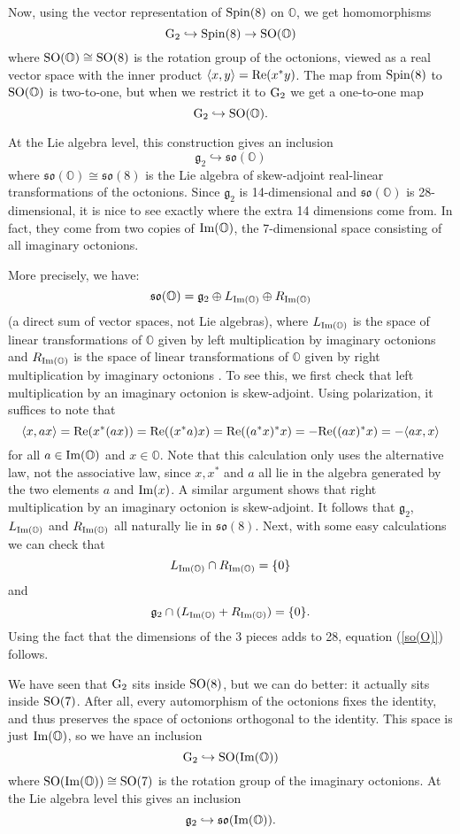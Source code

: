 \documentclass[12pt]{article}
\renewcommand\O{{\mathbb O}}
\newcommand{\SO}{{\rm SO}}
\newcommand{\Spin}{{\rm Spin}}
\newcommand{\G}{{\rm G}}
\newcommand{\so}{{\mathfrak {so}}}
\newcommand{\g}{{\mathfrak {g}}}
\renewcommand{\Re}{{\rm Re}}
\renewcommand{\Im}{{\rm Im}}
\newcommand{\iso}{\cong}
\newcommand{\be}{\begin{equation}}
\newcommand{\ee}{\end{equation}}
\begin{document}
Now, using the vector representation of $\Spin(8)$ on $\O$, we    
get homomorphisms   
\[       \G_2 \hookrightarrow \Spin(8) \to \SO(\O)  \]   
where $\SO(\O) \iso \SO(8)$ is the rotation group of the octonions,   
viewed as a real vector space with the inner product $\langle x,y\rangle   
= \Re(x^\ast y)$.   The map from $\Spin(8)$ to $\SO(\O)$ is two-to-one,   
but when we restrict it to $\G_2$ we get a one-to-one map   
\[       \G_2 \hookrightarrow \SO(\O) . \]   
   
At the Lie algebra level, this construction gives an inclusion   
\[      \g_2 \hookrightarrow \so(\O)  \]   
where $\so(\O) \iso \so(8)$ is the Lie algebra of skew-adjoint   
real-linear transformations of the octonions.   Since $\g_2$ is   
14-dimensional and $\so(\O)$ is 28-dimensional, it is nice to see   
exactly where the extra 14 dimensions come from.  In fact, they come   
from two copies of $\Im(\O)$, the 7-dimensional space consisting of all   
imaginary octonions.     
   
More precisely, we have:   
\be  \so(\O) = \g_2 \oplus L_{\Im(\O)} \oplus R_{\Im(\O)} \label{so(O)} \ee   
(a direct sum of vector spaces, not Lie algebras), where $L_{\Im(\O)}$    
is the space of linear transformations of $\O$ given by left multiplication   
by imaginary octonions and $R_{\Im(\O)}$ is the space of linear   
transformations of $\O$ given by right multiplication by imaginary   
octonions \cite{Schafer}.   To see this, we first check that left   
multiplication by an imaginary octonion is skew-adjoint.  Using   
polarization, it suffices to note that   
\[           \langle x,ax \rangle = \Re(x^*(ax)) = \Re((x^*a)x) =   
\Re((a^*x)^*x) = -\Re((ax)^* x) = -\langle ax,x \rangle \]   
for all $a \in \Im(\O)$ and $x \in \O$.  Note that this calculation only   
uses the alternative law, not the associative law, since $x, x^\ast$   
and $a$ all lie in the algebra generated by the two elements $a$ and    
$\Im(x)$.  A similar argument shows that right multiplication by   
an imaginary octonion is skew-adjoint.  It follows that    
$\g_2$, $L_{\Im(\O)}$ and $R_{\Im(\O)}$ all naturally lie in $\so(8)$.  
Next, with some easy calculations we can check that 
\[     L_{\Im(\O)} \cap R_{\Im(\O)} = \{0\} \]
and 
\[    \g_2 \cap (L_{\Im(\O)} + R_{\Im(\O)}) = \{0\} .\]
Using the fact that the dimensions of the 3 pieces adds to 28,
equation (\ref{so(O)}) follows.
   
We have seen that $\G_2$ sits inside $\SO(8)$, but we can do better: it   
actually sits inside $\SO(7)$.  After all, every automorphism of the   
octonions fixes the identity, and thus preserves the space of octonions   
orthogonal to the identity.  This space is just $\Im(\O)$, so   
we have an inclusion   
\[       \G_2 \hookrightarrow \SO(\Im(\O))  \]   
where $\SO(\Im(\O)) \iso \SO(7)$ is the rotation group of the imaginary   
octonions.  At the Lie algebra level this gives an inclusion   
\[        \g_2 \hookrightarrow \so(\Im(\O))  . \]   
   
\end{document}
